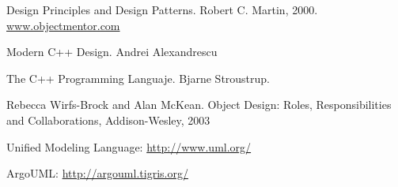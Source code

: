 \documentclass[a4paper,10pt]{article}
\begin{document}
\begin{thebibliography}{9}  
  Design Principles and Design Patterns. Robert C. Martin, 2000.\\
  \url{www.objectmentor.com}
  
  Modern C++ Design. Andrei Alexandrescu
  
  The C++ Programming Languaje. Bjarne Stroustrup.
  
  Rebecca Wirfs-Brock and Alan McKean. Object Design: Roles, Responsibilities
and Collaborations, Addison-Wesley, 2003

  Unified Modeling Language: \url{http://www.uml.org/}

  ArgoUML: \url{http://argouml.tigris.org/}

  
\end{thebibliography}
\end{document}
